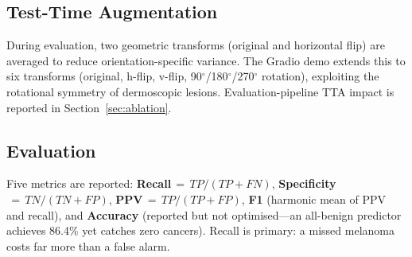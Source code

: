 \documentclass[conference]{IEEEtran}
\begin{document}
\begin{table}[t]
\caption{HP configurations and best-checkpoint results (EfficientNet-B0). All runs: LR${=}10^{-4}$, batch~32, 20~epochs; WD${=}10^{-5}$ for Exp.~2--3, else~0. $\Delta$FN: change in false negatives vs.\ prior row; \textsuperscript{$\ddagger$}vs.\ Baseline.}
\label{tab:hp}
\centering
{}
\end{table}

\subsection{Test-Time Augmentation}
During evaluation, two geometric transforms (original and horizontal flip)
are averaged to reduce orientation-specific variance. The Gradio demo
extends this to six transforms (original, h-flip, v-flip,
90$^\circ$/180$^\circ$/270$^\circ$ rotation), exploiting the rotational
symmetry of dermoscopic lesions. Evaluation-pipeline TTA impact is reported
in Section~\ref{sec:ablation}.

\subsection{Evaluation}
Five metrics are reported: \textbf{Recall}$\,{=}\,TP/(TP{+}FN)$,
\textbf{Specificity}$\,{=}\,TN/(TN{+}FP)$, \textbf{PPV}$\,{=}\,TP/(TP{+}FP)$,
\textbf{F1} (harmonic mean of PPV and recall), and \textbf{Accuracy} (reported
but not optimised---an all-benign predictor achieves 86.4\% yet catches zero
cancers). Recall is primary: a missed melanoma costs far more than a false alarm.
\end{document}
